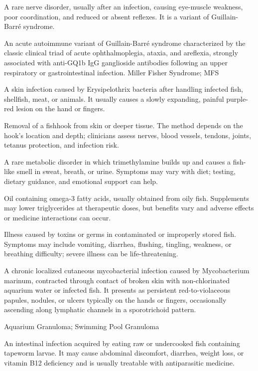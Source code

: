  A rare nerve disorder, usually after an infection, causing eye-muscle weakness, poor coordination, and reduced or absent reflexes. It is a variant of Guillain-Barré syndrome.

 An acute autoimmune variant of Guillain-Barré syndrome characterized by the classic clinical triad of acute ophthalmoplegia, ataxia, and areflexia, strongly associated with anti-GQ1b IgG ganglioside antibodies following an upper respiratory or gastrointestinal infection.
\synonyms
Miller Fisher Syndrome; MFS

 A skin infection caused by Erysipelothrix bacteria after handling infected fish, shellfish, meat, or animals. It usually causes a slowly expanding, painful purple-red lesion on the hand or fingers.

 Removal of a fishhook from skin or deeper tissue. The method depends on the hook’s location and depth; clinicians assess nerves, blood vessels, tendons, joints, tetanus protection, and infection risk.

 A rare metabolic disorder in which trimethylamine builds up and causes a fish-like smell in sweat, breath, or urine. Symptoms may vary with diet; testing, dietary guidance, and emotional support can help.

 Oil containing omega-3 fatty acids, usually obtained from oily fish. Supplements may lower triglycerides at therapeutic doses, but benefits vary and adverse effects or medicine interactions can occur.

 Illness caused by toxins or germs in contaminated or improperly stored fish. Symptoms may include vomiting, diarrhea, flushing, tingling, weakness, or breathing difficulty; severe illness can be life-threatening.

 A chronic localized cutaneous mycobacterial infection caused by Mycobacterium marinum, contracted through contact of broken skin with non-chlorinated aquarium water or infected fish. It presents as persistent red-to-violaceous papules, nodules, or ulcers typically on the hands or fingers, occasionally ascending along lymphatic channels in a sporotrichoid pattern.

\synonyms
Aquarium Granuloma; Swimming Pool Granuloma

 An intestinal infection acquired by eating raw or undercooked fish containing tapeworm larvae. It may cause abdominal discomfort, diarrhea, weight loss, or vitamin B12 deficiency and is usually treatable with antiparasitic medicine.

